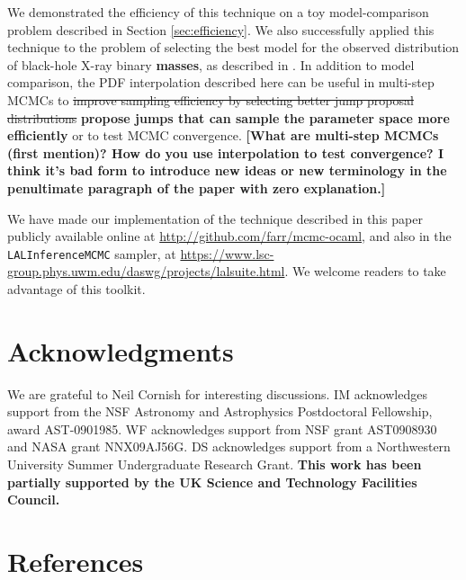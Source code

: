 \documentclass{iopart}
\newcommand{\ilya}[1]{{\color{red} \bf #1}}
\begin{document}
We demonstrated the efficiency of this technique on a toy
model-comparison problem described in Section \ref{sec:efficiency}.
We also successfully applied this technique to the problem of
selecting the best model for the observed distribution of black-hole
X-ray binary \ilya{masses}, as described in \cite{Farr2010}.  In addition to
model comparison, the PDF interpolation described here can be useful
in multi-step MCMCs to \sout{improve sampling efficiency by selecting
better jump proposal distributions} \ilya{propose jumps that can sample the parameter space more efficiently} or to test MCMC convergence. \ilya{[What are multi-step MCMCs (first mention)?  How do you use interpolation to test convergence?  I think it's bad form to introduce new ideas or new terminology in the penultimate paragraph of the paper with zero explanation.]}

We have made our implementation of the technique described in this
paper publicly available online at
\url{http://github.com/farr/mcmc-ocaml}, and also in the
\texttt{LALInferenceMCMC} sampler, at
\url{https://www.lsc-group.phys.uwm.edu/daswg/projects/lalsuite.html}.
We welcome readers to take advantage of this toolkit.


\section*{Acknowledgments}

We are grateful to Neil Cornish for interesting discussions.  IM
acknowledges support from the NSF Astronomy and Astrophysics
Postdoctoral Fellowship, award AST-0901985.  WF acknowledges support
from NSF grant AST0908930 and NASA grant NNX09AJ56G. DS acknowledges
support from a Northwestern University Summer Undergraduate Research Grant.  \ilya{This work has been partially supported by the UK Science and Technology Facilities Council.}

\section*{References}


%
\end{document}
